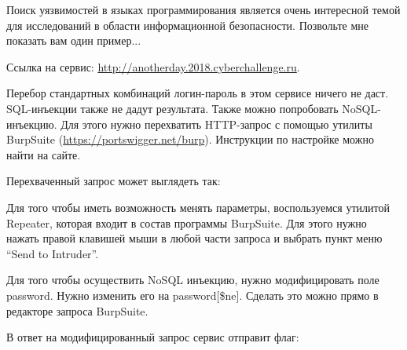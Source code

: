 
Поиск уязвимостей в языках программирования является очень интересной темой для исследований в области информационной безопасности. Позвольте мне показать вам один пример...

Ссылка на сервис: \url{http://anotherday.2018.cyberchallenge.ru}.

\solutionSection

Перебор стандартных комбинаций логин-пароль в этом сервисе ничего не даст. SQL-инъекции также не дадут результата. Также можно попробовать NoSQL-инъекцию. Для этого нужно перехватить HTTP-запрос с помощью утилиты BurpSuite (\url{https://portswigger.net/burp}). Инструкции по настройке можно найти на сайте.

Перехваченный запрос может выглядеть так:


Для того чтобы иметь возможность менять параметры, воспользуемся утилитой Repeater, которая входит в состав программы BurpSuite. Для этого нужно нажать правой клавишей мыши в любой части запроса и выбрать пункт меню “Send to Intruder”.


Для того чтобы осуществить NoSQL инъекцию, нужно модифицировать поле password. Нужно изменить его на password[\$ne]. Сделать это можно прямо в редакторе запроса BurpSuite.

В ответ на модифицированный запрос сервис отправит флаг:


